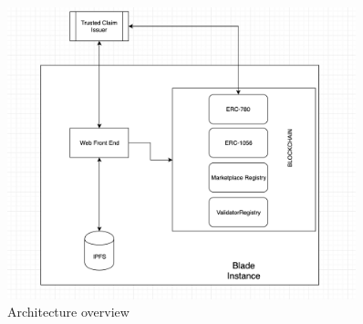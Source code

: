 \begin{figure}[htbp]
    \centerline{\includegraphics[width=0.9\textwidth]{figures/overview.png}}
    \caption{Architecture overview \label{fig:techstack}}
\end{figure}

